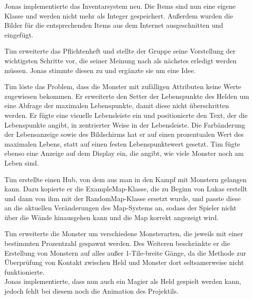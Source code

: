 
Jonas implementierte das Inventarsystem neu. Die Items sind nun eine eigene Klasse und werden nicht mehr als Integer gespeichert. Außerdem wurden die Bilder für die entsprechenden Items aus dem Internet ausgeschnitten und eingefügt. \\


Tim erweiterte das Pflichtenheft und stellte der Gruppe seine Vorstellung der wichtigsten Schritte vor, die seiner Meinung nach als nächstes erledigt werden müssen. Jonas stimmte diesen zu und ergänzte sie um eine Idee. \\


Tim löste das Problem, dass die Monster mit zufälligen Attributen keine Werte zugewiesen bekommen. Er erweiterte den Setter der Lebenspunkte des Helden um eine Abfrage der maximalen Lebenspunkte, damit diese nicht überschritten werden. Er fügte eine visuelle Lebensleiste ein und positionierte den Text, der die Lebenspunkte angibt, in zentrierter Weise in der Lebensleiste. Die Farbänderung der Lebensanzeige sowie des Bildschirms hat er auf einen prozentualen Wert des maximalen Lebens, statt auf einen festen Lebenspunktewert gesetzt. Tim fügte ebenso eine Anzeige auf dem Display ein, die angibt, wie viele Monster noch am Leben sind. \\


Tim erstellte einen \glqq{}Hub\grqq{}, von dem aus man in den Kampf mit Monstern gelangen kann. Dazu kopierte er die ExampleMap-Klasse, die zu Beginn von Lukas erstellt und dann von ihm mit der RandomMap-Klasse ersetzt wurde, und passte diese an die aktuellen Veränderungen des Map-Systems an, sodass der Spieler nicht über die Wände hinausgehen kann und die Map korrekt angezeigt wird. \\


Tim erweiterte die Monster um verschiedene Monsterarten, die jeweils mit einer bestimmten Prozentzahl gespawnt werden. Des Weiteren beschränkte er die Erstellung von Monstern auf alles außer 1-Tile-breite Gänge, da die Methode zur Überprüfung von Kontakt zwischen Held und Monster dort seltsamerweise nicht funktionierte. \\
Jonas implementierte, dass nun auch ein Magier als Held gespielt werden kann, jedoch fehlt bei diesem noch die Animation des Projektils. \\

